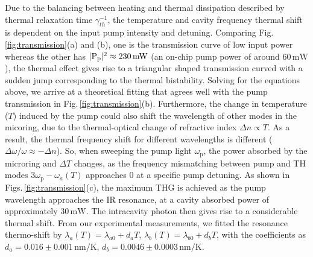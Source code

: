 \documentclass[9pt,twocolumn,twoside]{optica}
\begin{document}
Due to the balancing between heating and thermal dissipation described by thermal relaxation time $\gamma_{th}^{-1}$, the temperature and cavity frequency thermal shift is dependent on the input pump intensity and detuning. Comparing Fig.$\,$\ref{fig:transmission}(a) and (b), one is the transmission curve of low input power whereas the other has $|\mathrm{P_p}|^{2}\approx230\thinspace\mathrm{mW}$ (an on-chip pump power of around $60\,\mathrm{mW}$), the thermal effect gives rise to a triangular shaped transmission curved with a sudden jump corresponding to the thermal bistability. Solving for the equations above, we arrive at a theoretical fitting that agrees well with the pump transmission in Fig.$\,$\ref{fig:transmission}(b). Furthermore, the change in temperature ($T$) induced by the pump could also shift the wavelength of other modes in the micoring, due to the thermal-optical change of refractive index $\Delta n \propto T$. As a result, the thermal frequency shift for different wavelengths is different ($\Delta \omega/\omega \approx -\Delta n$). So, when sweeping the pump light $\omega_{\mathrm{p}}$, the power absorbed by the microring and $\Delta T$ changes, as the frequency mismatching between pump and TH modes $3\omega_{\mathrm{p}}-\omega_a (T)$ approaches $0$ at a specific pump detuning. As shown in Figs.$\,$\ref{fig:transmission}(c), the maximum THG is achieved as the pump wavelength approaches the IR resonance, at a cavity absorbed power of approximately $30\,\mathrm{mW}$.  The intracavity photon then gives rise to a considerable thermal shift. From our experimental measurements, we fitted the resonance thermo-shift by $\lambda_{a}(T)=\lambda_{a0}+d_{a}T$, $\lambda_{b}(T)=\lambda_{b0}+d_{b}T$, with the coefficients as $d_{a}=0.016\pm0.001\,\mathrm{nm/K}$, $d_{b}=0.0046\pm0.0003\,\mathrm{nm/K}$.

\end{document}
